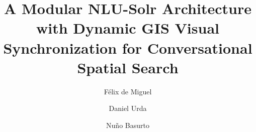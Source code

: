 \documentclass[preprint,12pt, a4paper]{elsarticle}
\begin{document}
\renewcommand{\labelenumii}{\arabic{enumi}.\arabic{enumii}}

\begin{frontmatter}

\title{A Modular NLU-Solr Architecture with Dynamic GIS Visual Synchronization for Conversational Spatial Search}

\author[1]{F{\'e}lix de Miguel }

\author[1]{Daniel Urda }

\author[1]{Nu{\~n}o Basurto }


\address[1]{Grupo de Inteligencia Computacional Aplicada (GICAP), Departamento de Digitalizaci{\'o}n, Escuela Polit{\'e}cnica Superior, Universidad de Burgos, Av. Cantabria s/n, 09006 Burgos, Spain}


\end{frontmatter}
\end{document}
